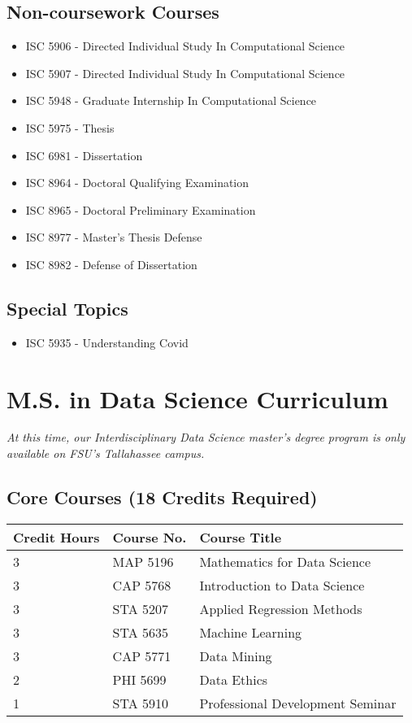 \documentclass[12pt,a4paper]{article}
\begin{document}
\subsection*{Non-coursework Courses}
\begin{itemize}
    \item ISC 5906 - Directed Individual Study In Computational Science
    \item ISC 5907 - Directed Individual Study In Computational Science
    \item ISC 5948 - Graduate Internship In Computational Science
    \item ISC 5975 - Thesis
    \item ISC 6981 - Dissertation
    \item ISC 8964 - Doctoral Qualifying Examination
    \item ISC 8965 - Doctoral Preliminary Examination
    \item ISC 8977 - Master's Thesis Defense
    \item ISC 8982 - Defense of Dissertation
\end{itemize}

\subsection*{Special Topics}
\begin{itemize}
    \item ISC 5935 - Understanding Covid
\end{itemize}
\newpage

\section{M.S. in Data Science Curriculum}
\textit{At this time, our Interdisciplinary Data Science master’s degree program is only available on FSU’s Tallahassee campus.}

\subsection*{Core Courses (18 Credits Required)}
\begin{tabular}{l l l}
\hline
\textbf{Credit Hours} & \textbf{Course No.} & \textbf{Course Title} \\ \hline
3 & MAP 5196 & Mathematics for Data Science \\
3 & CAP 5768 & Introduction to Data Science \\
3 & STA 5207 & Applied Regression Methods \\
3 & STA 5635 & Machine Learning \\
3 & CAP 5771 & Data Mining \\
2 & PHI 5699 & Data Ethics \\
1 & STA 5910 & Professional Development Seminar \\ \hline
\end{tabular}
\end{document}
